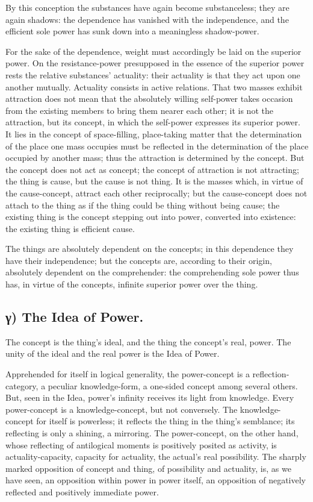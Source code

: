 \documentclass[12pt]{book}
\begin{document}
By this conception the substances have again become substanceless;
they are again shadows: the dependence has vanished with the
independence, and the efficient sole power has sunk down into a
meaningless shadow-power.

For the sake of the dependence, weight must accordingly be laid on
the superior power. On the resistance-power presupposed in the
essence of the superior power rests the relative substances'
actuality: their actuality is that they act upon one another
mutually. Actuality consists in active relations. That two masses
exhibit attraction does not mean that the absolutely willing
self-power takes occasion from the existing members to bring them
nearer each other; it is not the attraction, but its concept, in
which the self-power expresses its superior power. It lies in the
concept of space-filling, place-taking matter that the determination
of the place one mass occupies must be reflected in the
determination of the place occupied by another mass; thus the
attraction is determined by the concept. But the concept does not
act as concept; the concept of attraction is not attracting; the
thing is cause, but the cause is not thing. It is the masses which,
in virtue of the cause-concept, attract each other reciprocally; but
the cause-concept does not attach to the thing as if the thing could
be thing without being cause; the existing thing is the concept
stepping out into power, converted into existence: the existing
thing is efficient cause.

The things are absolutely dependent on the concepts; in this
dependence they have their independence; but the concepts are,
according to their origin, absolutely dependent on the comprehender:
the comprehending sole power thus has, in virtue of the concepts,
infinite superior power over the thing.

\subsection*{γ) The Idea of Power.}

The concept is the thing's ideal, and
the thing the concept's real, power. The unity of the ideal and the
real power is the Idea of Power.

Apprehended for itself in logical generality, the power-concept is a
reflection-category, a peculiar knowledge-form, a one-sided concept
among several others. But, seen in the Idea, power's infinity
receives its light from knowledge. Every power-concept is a
knowledge-concept, but not conversely. The knowledge-concept for
itself is powerless; it reflects the thing in the thing's semblance;
its reflecting is only a shining, a mirroring. The power-concept, on
the other hand, whose reflecting of antilogical moments is
positively posited as activity, is actuality-capacity, capacity for
actuality, the actual's real possibility. The sharply marked
opposition of concept and thing, of possibility and actuality, is,
as we have seen, an opposition within power in power itself, an
opposition of negatively reflected and positively immediate power.
\end{document}
